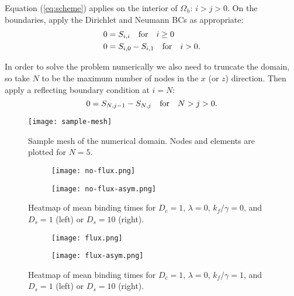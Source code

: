 \documentclass{article}
\newcommand{\tn}{\textnormal}
\begin{document}
Equation (\ref{eq:scheme}) applies on the interior of $\Omega_h$: $i >
j > 0$. On the boundaries, apply the Dirichlet and Neumann BCs as
appropriate:
\begin{align}
  0 &= S_{i, i} \quad \tn{for} \quad i \ge 0 \\
  0 &= S_{i, 0} - S_{i, 1} \quad \tn{for} \quad i > 0. \\
\end{align}

In order to solve the problem numerically we also need to truncate
the domain, so take $N$ to be the maximum number of nodes in the $x$
(or $z$) direction. Then apply a reflecting boundary condition at $i =
N$:
\begin{equation}
  \label{eq:trunc-bdy}
  0 = S_{N, j-1} - S_{N, j} \quad \tn{for} \quad N > j > 0.
\end{equation}

\begin{figure}
  \centering
  \texttt{[image: sample-mesh]}
  \caption[Sample mesh]{Sample mesh of the numerical domain. Nodes and
    elements are plotted for $N = 5$.}
  \label{fig:sample-mesh}
\end{figure}

\begin{figure}[p]
  \begin{subfigure}{0.48\textwidth}
    \centering
    \texttt{[image: no-flux.png]}
    \caption{}
    \label{fig:no-flux-sym}
  \end{subfigure}
  \hfill
  \begin{subfigure}{0.48\textwidth}
    \centering
    \texttt{[image: no-flux-asym.png]}
    \label{fig:no-flux-asym}
  \end{subfigure}
  \caption{Heatmap of mean binding times for $D_c = 1$, $\lambda = 0$,
    $k_f/\gamma = 0$, and $D_s = 1$ (left) or $D_s = 10$ (right).}
  \label{fig:no-flux}
\end{figure}

\begin{figure}[p]
  \begin{subfigure}{0.48\textwidth}
    \centering
    \texttt{[image: flux.png]}
    \label{fig:flux-sym}
  \end{subfigure}
  \hfill
  \begin{subfigure}{0.48\textwidth}
    \centering
    \texttt{[image: flux-asym.png]}
    \label{fig:flux-asym}
  \end{subfigure}
  \caption{Heatmap of mean binding times for $D_c = 1$, $\lambda = 0$,
    $k_f/\gamma = 1$, and $D_s = 1$ (left) or $D_s = 10$ (right).}
  \label{fig:flux}
\end{figure}
\end{document}

